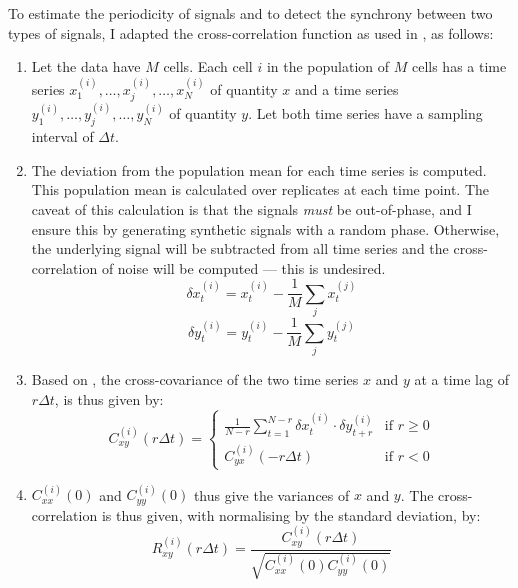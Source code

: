 To estimate the periodicity of signals and to detect the synchrony between two types of signals, I adapted the cross-correlation function as used in \textcite{pietschDeterminingGrowthRates2023}, as follows:

\begin{enumerate}
  \item Let the data have $M$ cells.
        Each cell $i$ in the population of $M$ cells has a time series $x_{1}^{(i)}, \ldots , x_{j}^{(i)}, \ldots , x_{N}^{(i)}$ of quantity $x$ and a time series $y_{1}^{(i)}, \ldots , y_{j}^{(i)}, \ldots , y_{N}^{(i)}$ of quantity $y$.
        Let both time series have a sampling interval of $\Delta t$.
  \item The deviation from the population mean for each time series is computed.
        This population mean is calculated over replicates at each time point.
        The caveat of this calculation is that the signals \emph{must} be out-of-phase, and I ensure this by generating synthetic signals with a random phase.
        Otherwise, the underlying signal will be subtracted from all time series and the cross-correlation of noise will be computed --- this is undesired.
        \begin{equation}
          \delta x_{t}^{(i)} = x_{t}^{(i)} - \frac{1}{M} \sum_{j}x_{t}^{(j)}
          \label{eq:xcf-dmeans-x}
        \end{equation}
        \begin{equation}
          \delta y_{t}^{(i)} = y_{t}^{(i)} - \frac{1}{M} \sum_{j}y_{t}^{(j)}
          \label{eq:xcf-dmeans-y}
        \end{equation}
  \item Based on \textcite{kivietStochasticityMetabolismGrowth2014}, the cross-covariance of the two time series $x$ and $y$ at a time lag of $r\Delta t$, is thus given by:
        \begin{equation}
          C_{xy}^{(i)}(r\Delta t) =
          \begin{cases}
            \frac{1}{N-r} \sum_{t=1}^{N-r} \delta x_{t}^{(i)} \cdot \delta y_{t+r}^{(i)} & \text{if } r \geq 0 \\
            C_{yx}^{(i)}(-r \Delta t) & \text{if } r < 0
          \end{cases}
          \label{eq:xcf-xcov}
        \end{equation}
    \item $C_{xx}^{(i)}(0)$ and $C_{yy}^{(i)}(0)$ thus give the variances of $x$ and $y$.  The cross-correlation is thus given, with normalising by the standard deviation, by:
        \begin{equation}
          R_{xy}^{(i)}(r \Delta t) = \frac{C_{xy}^{(i)}(r \Delta t)}{\sqrt{C_{xx}^{(i)}(0) C_{yy}^{(i)}(0)}}
          \label{eq:xcf-xcf}
        \end{equation}
\end{enumerate}

